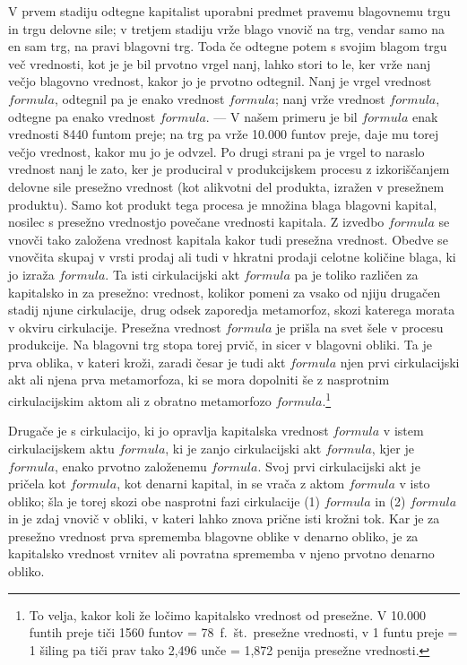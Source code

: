 \documentclass[kapital_02.tex]{subfiles}
\begin{document}
V prvem stadiju odtegne kapitalist uporabni predmet pravemu blagovnemu trgu in trgu delovne sile; v tretjem stadiju vrže blago vnovič na trg, vendar samo na en sam trg, na pravi blagovni trg. Toda če odtegne potem s svojim blagom trgu več vrednosti, kot je je bil prvotno vrgel nanj, lahko stori to le, ker vrže nanj večjo blagovno vrednost, kakor jo je prvotno odtegnil. Nanj je vrgel vrednost \( formula \), odtegnil pa je enako vrednost \( formula \); nanj vrže vrednost \( formula \), odtegne pa enako vrednost \( formula \). --- V našem primeru je bil \( formula \) enak vrednosti 8440 funtom preje; na trg pa vrže 10.000 funtov preje, daje mu torej večjo vrednost, kakor mu jo je odvzel. Po drugi strani pa je vrgel to naraslo vrednost nanj le zato, ker je produciral v produkcijskem procesu z izkoriščanjem delovne sile presežno vrednost (kot alikvotni del produkta, izražen v presežnem produktu). Samo kot produkt tega procesa je množina blaga blagovni kapital, nosilec s presežno vrednostjo povečane vrednosti kapitala. Z izvedbo \( formula \) se vnovči tako založena vrednost kapitala kakor tudi presežna vrednost. Obedve se vnovčita skupaj v vrsti prodaj ali tudi v hkratni prodaji celotne količine blaga, ki jo izraža \( formula \). Ta isti cirkulacijski akt \( formula \) pa je toliko različen za kapitalsko in za presežno: vrednost, kolikor pomeni za vsako od njiju drugačen stadij njune cirkulacije, drug odsek zaporedja metamorfoz, skozi katerega morata v okviru cirkulacije. Presežna vrednost \( formula \) je prišla na svet šele v procesu produkcije. Na blagovni trg stopa torej prvič, in sicer v blagovni obliki. Ta je prva oblika, v kateri kroži, zaradi česar je tudi akt \( formula \) njen prvi cirkulacijski akt ali njena prva metamorfoza, ki se mora dopolniti še z nasprotnim cirkulacijskim aktom ali z obratno metamorfozo \( formula \).\footnote{To velja, kakor koli že ločimo kapitalsko vrednost od presežne. V 10.000 funtih preje tiči 1560 funtov = 78~f.~št.\ presežne vrednosti, v 1 funtu preje = 1 šiling pa tiči prav tako 2,496 unče = 1,872 penija presežne vrednosti.}

Drugače je s cirkulacijo, ki jo opravlja kapitalska vrednost \( formula \) v istem cirkulacijskem aktu \( formula \), ki je zanjo cirkulacijski akt \( formula \), kjer je \( formula \), enako prvotno založenemu \( formula \). Svoj prvi cirkulacijski akt je pričela kot \( formula \), kot denarni kapital, in se vrača z aktom \( formula \) v isto obliko; šla je torej skozi obe nasprotni fazi cirkulacije (1) \( formula \) in (2) \( formula \) in je zdaj vnovič v obliki, v kateri lahko znova prične isti krožni tok. Kar je za presežno vrednost prva sprememba blagovne oblike v denarno obliko, je za kapitalsko vrednost vrnitev ali povratna sprememba v njeno prvotno denarno obliko.
\end{document}
